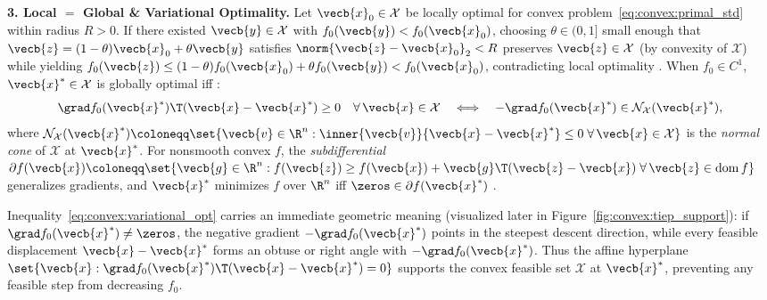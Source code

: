 \documentclass[../../../../master.tex]{subfiles}
\begin{document}
\begin{coremath}
\textbf{3. Local $=$ Global \& Variational Optimality.} Let $\vecb{x}_0 \in \mathcal{X}$ be locally optimal for convex problem~\eqref{eq:convex:primal_std} within radius $R > 0$. If there existed $\vecb{y} \in \mathcal{X}$ with $f_0(\vecb{y}) < f_0(\vecb{x}_0)$, choosing $\theta \in (0, 1]$ small enough that $\vecb{z} = (1-\theta)\vecb{x}_0 + \theta\vecb{y}$ satisfies $\norm{\vecb{z}-\vecb{x}_0}_2 < R$ preserves $\vecb{z} \in \mathcal{X}$ (by convexity of $\mathcal{X}$) while yielding $f_0(\vecb{z}) \le (1-\theta)f_0(\vecb{x}_0) + \theta f_0(\vecb{y}) < f_0(\vecb{x}_0)$, contradicting local optimality . When $f_0 \in C^1$, $\vecb{x}^* \in \mathcal{X}$ is globally optimal iff :
\begin{equation}
  \grad f_0(\vecb{x}^*)\T(\vecb{x} - \vecb{x}^*) \ge 0 \quad \forall\,\vecb{x} \in \mathcal{X}
  \quad\Longleftrightarrow\quad
  -\grad f_0(\vecb{x}^*) \in \mathcal{N}_{\mathcal{X}}(\vecb{x}^*),
  \label{eq:convex:variational_opt}
\end{equation}
where $\mathcal{N}_{\mathcal{X}}(\vecb{x}^*) \coloneqq \set{\vecb{v} \in \R^n : \inner{\vecb{v}}{\vecb{x} - \vecb{x}^*} \le 0\;\forall\,\vecb{x} \in \mathcal{X}}$ is the \emph{normal cone} of $\mathcal{X}$ at $\vecb{x}^*$. For nonsmooth convex $f$, the \emph{subdifferential} $\partial f(\vecb{x}) \coloneqq \set{\vecb{g} \in \R^n : f(\vecb{z}) \ge f(\vecb{x}) + \vecb{g}\T(\vecb{z}-\vecb{x})\;\forall\,\vecb{z} \in \operatorname{dom} f}$ generalizes gradients, and $\vecb{x}^*$ minimizes $f$ over $\R^n$ iff $\zeros \in \partial f(\vecb{x}^*)$ .
\end{coremath}

\begin{intuition}
Inequality~\eqref{eq:convex:variational_opt} carries an immediate geometric meaning (visualized later in Figure~\ref{fig:convex:tiep_support}): if $\grad f_0(\vecb{x}^*) \neq \zeros$, the negative gradient $-\grad f_0(\vecb{x}^*)$ points in the steepest descent direction, while every feasible displacement $\vecb{x} - \vecb{x}^*$ forms an obtuse or right angle with $-\grad f_0(\vecb{x}^*)$. Thus the affine hyperplane $\set{\vecb{x} : \grad f_0(\vecb{x}^*)\T(\vecb{x} - \vecb{x}^*) = 0}$ supports the convex feasible set $\mathcal{X}$ at $\vecb{x}^*$, preventing any feasible step from decreasing $f_0$.
\end{intuition}
\end{document}
